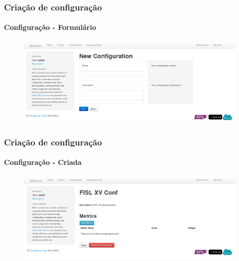 \documentclass{beamer}
\begin{document}
  \begin{frame}
    \frametitle{Criação de configuração}
    \framesubtitle{Configuração - Formulário}

    \begin{figure}[htb]
      \begin{center}
        \includegraphics[scale=0.24]{images/06-new-configuration-form.png}
      \end{center}
    \end{figure}
  \end{frame}

  \begin{frame}
    \frametitle{Criação de configuração}
    \framesubtitle{Configuração - Criada}

    \begin{figure}[htb]
      \begin{center}
        \includegraphics[scale=0.24]{images/07-new-configuration-created.png}
      \end{center}
    \end{figure}
  \end{frame}
\end{document}
